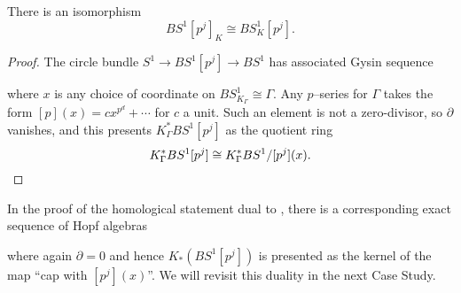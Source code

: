 \begin{theorem}\label{KtheoryConvertsTorsionToTorsion}
There is an isomorphism \[BS^1[p^j]_K \cong BS^1_K[p^j].\]
\end{theorem}
\begin{proof}
The circle bundle \(S^1 \to BS^1[p^j] \to BS^1\) has associated Gysin sequence
\begin{center}
\end{center}
where \(x\) is any choice of coordinate on \(BS^1_{K_\Gamma} \cong \Gamma\).  Any \(p\)--series for \(\Gamma\) takes the form \([p](x) = c x^{p^d} + \cdots\) for \(c\) a unit.  Such an element is not a zero-divisor, so \(\partial\) vanishes, and this presents \(K_\Gamma^* BS^1[p^j]\) as the quotient ring \[K_\Gamma^* BS^1[p^j] \cong K_\Gamma^* BS^1 / [p^j](x). \qedhere\]
\end{proof}

\begin{remark}\label{KHomologyOfClassifyingSpace}
In the proof of the homological statement dual to , there is a corresponding exact sequence of Hopf algebras
\begin{center}
\end{center}
where again \(\partial = 0\) and hence \(K_*(BS^1[p^j])\) is presented as the kernel of the map ``cap with \([p^j](x)\)''.  We will revisit this duality in the next Case Study.
\end{remark}

